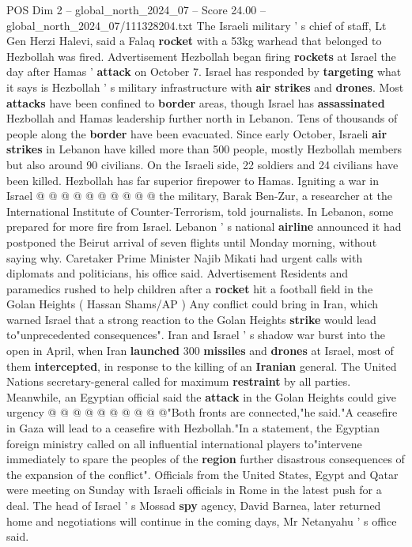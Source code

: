 \begin{textsample}{POS Dim 2 – global\_north\_2024\_07 – Score 24.00 – global\_north\_2024\_07/111328204.txt}
The Israeli military ' s chief of staff, Lt Gen Herzi Halevi, said a Falaq \textbf{rocket} with a 53kg warhead that belonged to Hezbollah was fired.
Advertisement Hezbollah began firing \textbf{rockets} at Israel the day after Hamas ' \textbf{attack} on October 7.
Israel has responded by \textbf{targeting} what it says is Hezbollah ' s military infrastructure with \textbf{air} \textbf{strikes} and \textbf{drones}.
Most \textbf{attacks} have been confined to \textbf{border} areas, though Israel has \textbf{assassinated} Hezbollah and Hamas leadership further north in Lebanon.
Tens of thousands of people along the \textbf{border} have been evacuated.
Since early October, Israeli \textbf{air} \textbf{strikes} in Lebanon have killed more than 500 people, mostly Hezbollah members but also around 90 civilians.
On the Israeli side, 22 soldiers and 24 civilians have been killed.
Hezbollah has far superior firepower to Hamas.
Igniting a war in Israel @ @ @ @ @ @ @ @ @ @ the military, Barak Ben-Zur, a researcher at the International Institute of Counter-Terrorism, told journalists.
In Lebanon, some prepared for more fire from Israel.
Lebanon ' s national \textbf{airline} announced it had postponed the Beirut arrival of seven flights until Monday morning, without saying why.
Caretaker Prime Minister Najib Mikati had urgent calls with diplomats and politicians, his office said.
Advertisement Residents and paramedics rushed to help children after a \textbf{rocket} hit a football field in the Golan Heights ( Hassan Shams/AP ) Any conflict could bring in Iran, which warned Israel that a strong reaction to the Golan Heights \textbf{strike} would lead to"unprecedented consequences".
Iran and Israel ' s shadow war burst into the open in April, when Iran \textbf{launched} 300 \textbf{missiles} and \textbf{drones} at Israel, most of them \textbf{intercepted}, in response to the killing of an \textbf{Iranian} general.
The United Nations secretary-general called for maximum \textbf{restraint} by all parties.
Meanwhile, an Egyptian official said the \textbf{attack} in the Golan Heights could give urgency @ @ @ @ @ @ @ @ @ @"Both fronts are connected,"he said."A ceasefire in Gaza will lead to a ceasefire with Hezbollah."In a statement, the Egyptian foreign ministry called on all influential international players to"intervene immediately to spare the peoples of the \textbf{region} further disastrous consequences of the expansion of the conflict".
Officials from the United States, Egypt and Qatar were meeting on Sunday with Israeli officials in Rome in the latest push for a deal.
The head of Israel ' s Mossad \textbf{spy} agency, David Barnea, later returned home and negotiations will continue in the coming days, Mr Netanyahu ' s office said.

\end{textsample}
